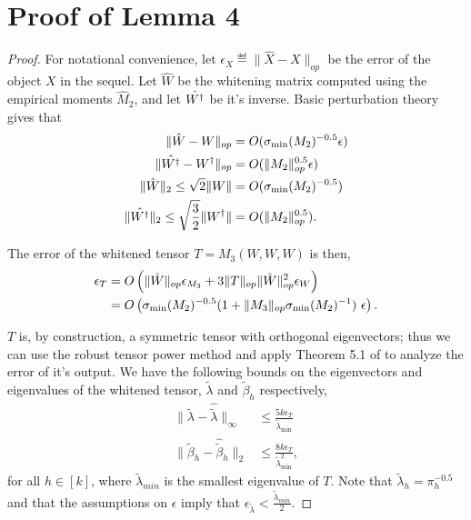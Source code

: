 \section{Proof of Lemma 4}
\label{sec:proofs}

\begin{proof}

For notational convenience, let $\epsilon_{X} \eqdef \|\hat X - X\|_{op}$ be
the error of the object $X$ in the sequel. Let $\hat W$ be the whitening
matrix computed using the empirical moments $\hat M_2$, and let $\hat
{W^{\dagger}}$ be it's inverse. Basic perturbation theory gives that 
\begin{align*}
\|\hat W - W\|_{op} &= O(\sigma_\text{\rm min}(M_2)^{-0.5} \epsilon)\\
\|\hat {W^{\dagger}} - W^{\dagger}\|_{op} &= O(\|M_2\|_{op}^{0.5} \epsilon)\\ 
\|\hat W\|_2 \le \sqrt{2} \|W\| &= O(\sigma_\text{\rm min}(M_2)^{-0.5}) \\ 
\|\hat {W^{\dagger}}\|_2 \le \sqrt\frac{3}{2} \|W^{\dagger}\| &= O(\|M_2\|_{op}^{0.5}). 
\end{align*}

The error of the whitened tensor $T = M_3(W,W,W)$ is then,
\begin{align*}
\epsilon_T 
&= O\left( \|\hat W\|_{op} \epsilon_{M_3} + 3 \|T\|_{op} \|\hat W\|_{op}^2 \epsilon_{W} \right ) \\
  &= O\left(\sigma_\text{\rm min}(M_2)^{-0.5} (1 + \|M_3\|_{op} \sigma_\text{\rm min}(M_2)^{-1} )~\epsilon\right).
\end{align*}

$T$ is, by construction, a symmetric tensor with orthogonal
eigenvectors; thus we can use the robust tensor power method and apply
Theorem 5.1 of \citet{AnandkumarGeHsu2012} to analyze the error of it's
output. We have the following bounds on the eigenvectors and eigenvalues
of the whitened tensor, $\tilde \lambda$ and $\tilde \beta_h$ respectively, 
\begin{align*}
  \|\tilde \lambda - \hat {\tilde \lambda} \|_{\infty} 
    &\le \frac{5 k \epsilon_T}{\tilde \lambda_{\min}} \\
    \|\tilde \beta_h - \hat {\tilde \beta}_h \|_2 
    &\le \frac{8 k \epsilon_T}{\tilde \lambda_{\min}^2},
\end{align*}
for all $h \in [k]$, where $\tilde \lambda_{min}$ is the smallest
eigenvalue of $T$. Note that $\tilde \lambda_h = \pi_h^{-0.5}$ and that
the assumptions on $\epsilon$ imply that $\epsilon_{\tilde \lambda}
< \frac{\tilde \lambda_{min}}{2}$.


\end{proof}

